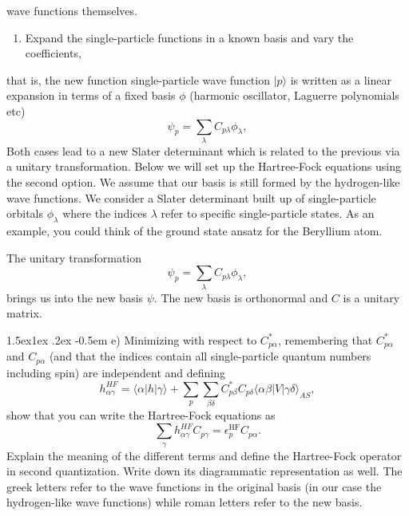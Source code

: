 \documentclass[%
oneside,                 %
final,                   %
10pt]{article}
\makeatletter
\newenvironment{doconceexercise}{}{}
\newcommand\subex{\@startsection{paragraph}{4}{\z@}%
                  {1.5ex\@plus1ex \@minus.2ex}%
                  {-0.5em}%
                  {\normalfont\normalsize\bfseries}}
\makeatother
\begin{document}
\begin{doconceexercise}
\noindent
wave functions themselves. 
\begin{enumerate}
\item Expand the single-particle functions in a known basis  and vary the coefficients, 
\end{enumerate}

\noindent
that is, the new function single-particle wave function $|p\rangle$ is written as a linear expansion in terms of a fixed basis $\phi$ (harmonic oscillator, Laguerre polynomials etc)
\[
\psi_p  = \sum_{\lambda} C_{p\lambda}\phi_{\lambda},
\]
Both cases lead to a new Slater determinant which is related to the previous via  a unitary transformation.
Below we will set up the Hartree-Fock equations using the second option.  
We assume that our basis is still formed by the hydrogen-like wave functions. 
We consider a Slater determinant built up of single-particle orbitals $\phi_{\lambda}$ where the indices $\lambda$ refer to specific single-particle states.  As an example, you could think of the ground state ansatz for the Beryllium atom. 

The unitary transformation
\[
\psi_p  = \sum_{\lambda} C_{p\lambda}\phi_{\lambda},
\]
brings us into the new basis $\psi$.  The new basis is orthonormal and $C$ is a unitary matrix.

\subex{e)}
Minimizing with respect to $C^*_{p\alpha}$, remembering that $C^*_{p\alpha}$ and $C_{p\alpha}$ (and that the indices contain all single-particle quantum numbers including spin)
are independent and defining
\[
h_{\alpha\gamma}^{HF}=\langle \alpha | h | \gamma \rangle+
\sum_{p}\sum_{\beta\delta} C^*_{p\beta}C_{p\delta}\langle \alpha\beta|V|\gamma\delta\rangle_{AS},
\]
show that you can write the Hartree-Fock  equations as 
\[
\sum_{\gamma}h_{\alpha\gamma}^{HF}C_{p\gamma}=\epsilon_p^{\mathrm{HF}}C_{p\alpha}.
\]
Explain the meaning of the different terms and define the Hartree-Fock 
operator in second quantization. Write down its diagrammatic representation as well.  The greek letters refer to the wave functions in the original basis (in our case the hydrogen-like wave functions) while roman letters refer to the new basis.


\end{doconceexercise}
\end{document}
